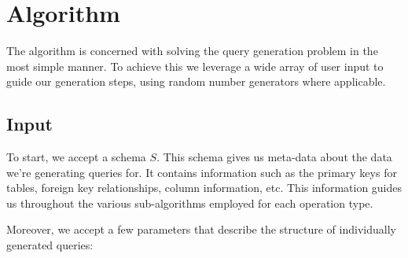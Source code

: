 \documentclass[10pt, twocolumn]{article}
\begin{document}
\section{Algorithm}

The algorithm is concerned with solving the query generation problem in the most simple manner. To achieve this we leverage a wide array of user input to guide our generation steps, using random number generators where applicable.

\subsection*{Input}

To start, we accept a schema $S$. This schema gives us meta-data about the data we're generating queries for. It contains information such as the primary keys for tables, foreign key relationships, column information, etc. This information guides us throughout the various sub-algorithms employed for each operation type.

\spacing
\noindent
Moreover, we accept a few parameters that describe the structure of individually generated queries:
\end{document}
